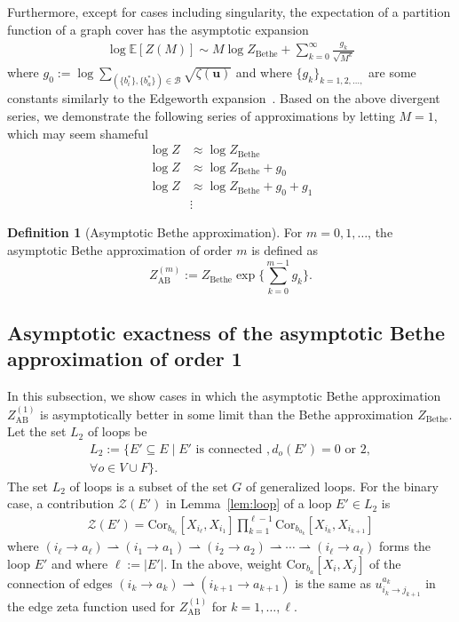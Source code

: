 \documentclass[a4paper,10pt,twoside,twocolumn,openany,final]{memoir}
\newcommand{\Cor}{\mathrm{Cor}}
\theoremstyle{plain}
\theoremstyle{definition}
\newtheorem{definition}[theorem]{Definition}
\theoremstyle{remark}
\begin{document}
Furthermore, except for cases including singularity, the expectation of a partition function of a graph cover has the asymptotic expansion
\begin{align*}
\log \mathbb{E}[Z(M)] \sim M \log Z_\mathrm{Bethe} + \sum_{k=0}^\infty \frac{g_k}{\sqrt{M^k}}
\end{align*}
where
$g_0 := \log\sum_{(\{b^*_i\}, \{b^*_a\})\in\mathcal{B}} \sqrt{\zeta(\bm{u})}$
and where $\{g_k\}_{k=1,2,\dotsc,}$ are some constants similarly to the Edgeworth expansion~\cite{chambers1967methods}.
Based on the above divergent series, we demonstrate the following series of approximations by letting $M=1$, which may seem shameful
\begin{align*}
\log Z &\approx \log Z_\mathrm{Bethe}\\
\log Z &\approx \log Z_\mathrm{Bethe} + g_0\\
\log Z &\approx \log Z_\mathrm{Bethe} + g_0 + g_1\\
&\vdots
\end{align*}

\begin{definition}[Asymptotic Bethe approximation]
For $m=0,1,\dotsc$, the asymptotic Bethe approximation of order $m$ is defined as
\begin{equation*}
Z_{\mathrm{AB}}^{(m)} := Z_\mathrm{Bethe}\exp\bigg\{\sum_{k=0}^{m-1} g_k\bigg\}.
\end{equation*}
\end{definition}


\subsection{Asymptotic exactness of the asymptotic Bethe approximation of order 1}
In this subsection, we show cases in which the asymptotic Bethe approximation $Z_{\mathrm{AB}}^{(1)}$ is asymptotically better in some limit than 
the Bethe approximation $Z_\mathrm{Bethe}$.
Let the set $L_2$ of loops be
\begin{align*}
L_2 := \big\{E'\subseteq E\mid \text{$E'$ is connected }, d_o(E') = 0 \text{ or }2,\\
 \forall o\in V\cup F\big\}.
\end{align*}
The set $L_2$ of loops is a subset of the set $G$ of generalized loops.
For the binary case, a contribution $\mathcal{Z}(E')$ in Lemma~\ref{lem:loop} of a loop $E'\in L_2$ is
\begin{align*}
\mathcal{Z}(E')=
\Cor_{b_{a_\ell}}[X_{i_\ell}, X_{i_{1}}]
\prod_{k=1}^{\ell-1}
\Cor_{b_{a_k}}[X_{i_k}, X_{i_{k+1}}]
\end{align*}
where $(i_\ell\to a_\ell)\rightharpoonup(i_1\to a_1)\rightharpoonup(i_2\to a_2)\rightharpoonup \dotsb \rightharpoonup(i_\ell\to a_\ell)$
forms the loop $E'$ and where $\ell:= |E'|$.
In the above, weight $\Cor_{b_a}[X_i, X_j]$ of the connection of edges $(i_k\to a_k)\rightharpoonup (i_{k+1}\to a_{k+1})$
is the same as $u_{i_k\to j_{k+1}}^{a_k}$ in the edge zeta function used for $Z_{\mathrm{AB}}^{(1)}$ for $k=1,\dotsc,\ell$.
\end{document}
